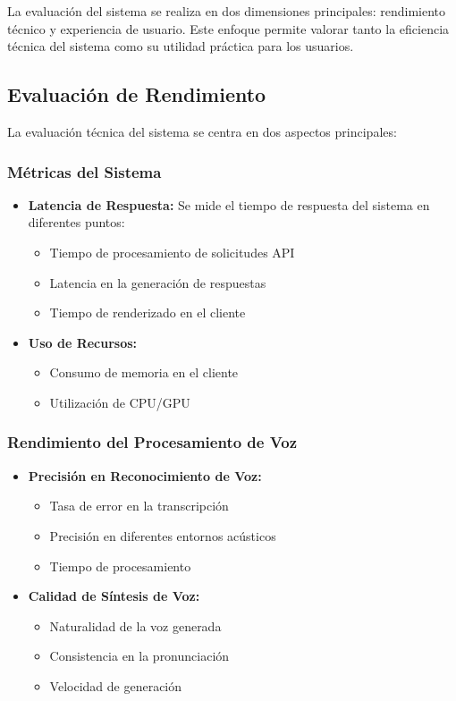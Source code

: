 La evaluación del sistema se realiza en dos dimensiones principales: rendimiento técnico y experiencia de usuario. Este enfoque permite valorar tanto la eficiencia técnica del sistema como su utilidad práctica para los usuarios.

\subsection{Evaluación de Rendimiento}
\label{evaluacion-rendimiento}

La evaluación técnica del sistema se centra en dos aspectos principales:

\subsubsection{Métricas del Sistema}

\begin{itemize}
	\item \textbf{Latencia de Respuesta:} Se mide el tiempo de respuesta del sistema en diferentes puntos:
	      \begin{itemize}
		      \item Tiempo de procesamiento de solicitudes API
		      \item Latencia en la generación de respuestas
		      \item Tiempo de renderizado en el cliente
	      \end{itemize}

	\item \textbf{Uso de Recursos:}
	      \begin{itemize}
		      \item Consumo de memoria en el cliente
		      \item Utilización de CPU/GPU
	      \end{itemize}
\end{itemize}

\subsubsection{Rendimiento del Procesamiento de Voz}

\begin{itemize}
	\item \textbf{Precisión en Reconocimiento de Voz:}
	      \begin{itemize}
		      \item Tasa de error en la transcripción
		      \item Precisión en diferentes entornos acústicos
		      \item Tiempo de procesamiento
	      \end{itemize}

	\item \textbf{Calidad de Síntesis de Voz:}
	      \begin{itemize}
		      \item Naturalidad de la voz generada
		      \item Consistencia en la pronunciación
		      \item Velocidad de generación
	      \end{itemize}
\end{itemize}


